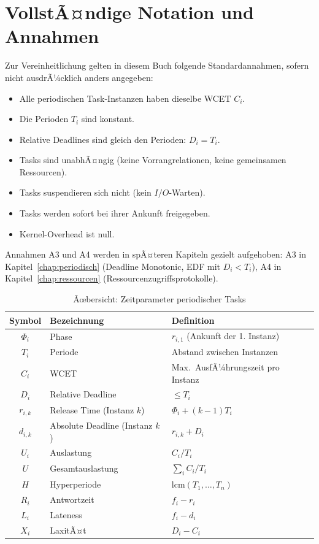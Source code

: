 ﻿\documentclass[a4paper,12pt]{report}
\theoremstyle{definition}
\begin{document}
\section{VollstÃ¤ndige Notation und Annahmen}

Zur Vereinheitlichung gelten in diesem Buch folgende Standardannahmen,
sofern nicht ausdrÃ¼cklich anders angegeben:

\begin{itemize}
	\item[\textbf{A1}] Alle periodischen Task-Instanzen haben dieselbe WCET $C_i$.
	\item[\textbf{A2}] Die Perioden $T_i$ sind konstant.
	\item[\textbf{A3}] Relative Deadlines sind gleich den Perioden: $D_i = T_i$.
	\item[\textbf{A4}] Tasks sind unabhÃ¤ngig (keine Vorrangrelationen, keine gemeinsamen Ressourcen).
	\item[\textbf{A5}] Tasks suspendieren sich nicht (kein $I/O$-Warten).
	\item[\textbf{A6}] Tasks werden sofort bei ihrer Ankunft freigegeben.
	\item[\textbf{A7}] Kernel-Overhead ist null.
\end{itemize}

Annahmen A3 und A4 werden in spÃ¤teren Kapiteln gezielt aufgehoben:
A3 in Kapitel~\ref{chap:periodisch} (Deadline Monotonic, EDF mit $D_i < T_i$),
A4 in Kapitel~\ref{chap:ressourcen} (Ressourcenzugriffsprotokolle).

\begin{table}[H]
	\centering
	\caption{Ãœbersicht: Zeitparameter periodischer Tasks}
	\begin{tabular}{cll}
		\toprule
		\textbf{Symbol} & \textbf{Bezeichnung} & \textbf{Definition} \\
		\midrule
		$\Phi_i$ & Phase & $r_{i,1}$ (Ankunft der 1. Instanz) \\
		$T_i$ & Periode & Abstand zwischen Instanzen \\
		$C_i$ & WCET & Max.\ AusfÃ¼hrungszeit pro Instanz \\
		$D_i$ & Relative Deadline & $\leq T_i$ \\
		$r_{i,k}$ & Release Time (Instanz $k$) & $\Phi_i + (k-1)T_i$ \\
		$d_{i,k}$ & Absolute Deadline (Instanz $k$) & $r_{i,k} + D_i$ \\
		$U_i$ & Auslastung & $C_i/T_i$ \\
		$U$ & Gesamtauslastung & $\sum_i C_i/T_i$ \\
		$H$ & Hyperperiode & $\mathrm{lcm}(T_1,\ldots,T_n)$ \\
		$R_i$ & Antwortzeit & $f_i - r_i$ \\
		$L_i$ & Lateness & $f_i - d_i$ \\
		$X_i$ & LaxitÃ¤t & $D_i - C_i$ \\
		\bottomrule
	\end{tabular}
\end{table}
\end{document}
